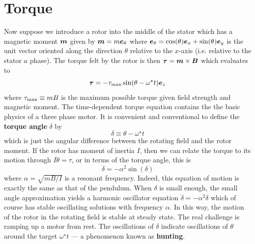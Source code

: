 \documentclass[onecolumn]{gwclass}
\begin{document}
	\section{Torque}
	Now suppose we introduce a rotor into the middle of the stator which has a magnetic moment $\boldsymbol{m}$ given by $\boldsymbol{m}=m\boldsymbol{e}_\theta$ where $\boldsymbol{e}_\theta=\cos(\theta)\boldsymbol{e}_x + \sin(\theta)\boldsymbol{e}_y$ is the unit vector oriented along the direction $\theta$ relative to the $x$-axis (i.e. relative to the stator $a$ phase). The torque felt by the rotor is then $\boldsymbol{\tau} = \boldsymbol{m}\times\boldsymbol{B}$ which evaluates to 
	$$ \boldsymbol{\tau} = -\tau_{\text{\normalfont{max}}} \sin( \theta - \omega^\star t)\boldsymbol{e}_z $$
	where $\tau_{\text{\normalfont{max}}}\equiv mB$ is the maximum possible torque given field strength and magnetic moment. The time-dependent torque equation contains the the basic physics of a three phase motor. It is convenient and conventional to define the \textbf{torque angle} $\delta$ by
	$$ \delta\equiv \theta - \omega^\star t $$
	which is just the angular difference between the rotating field and the rotor moment. If the rotor has moment of inertia $I$, then we can relate the torque to its motion through $I\ddot{\theta}=\tau$, or in terms of the torque angle, this is
	$$ \ddot{\delta} = - \alpha^2 \sin(\delta) $$
	where $\alpha=\sqrt{mB/I}$ is a resonant frequency. Indeed, this equation of motion is exactly the same as that of the pendulum. When $\delta$ is small enough, the small angle approximation yields a harmonic oscillator equation $\ddot{\delta}=-\alpha^2\delta$ which of course has stable oscillating solutions with frequency $\alpha$. In this way, the motion of the rotor in the rotating field is stable at steady state. The real challenge is ramping up a motor from rest. The oscillations of $\delta$ indicate oscillations of $\theta$ around the target $\omega^\star t$ --- a phenomenon known as \textbf{hunting}.
	
\end{document}
